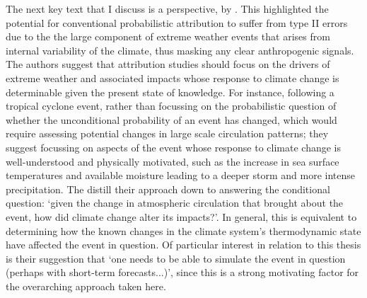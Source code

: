     The next key text that I discuss is a perspective,  by \citet{trenberth_attribution_2015}. This highlighted the potential for conventional probabilistic attribution to suffer from type II errors due to the the large component of extreme weather events that arises from internal variability of the climate, thus masking any clear anthropogenic signals. The authors suggest that attribution studies should focus on the drivers of extreme weather and associated impacts whose response to climate change is determinable given the present state of knowledge. For instance, following a tropical cyclone event, rather than focussing on the probabilistic question of whether the unconditional probability of an event has changed, which would require assessing potential changes in large scale circulation patterns; they suggest focussing on aspects of the event whose response to climate change is well-understood and physically motivated, such as the increase in sea surface temperatures and available moisture leading to a deeper storm and more intense precipitation. The distill their approach down to answering the conditional question: `given the change in atmospheric circulation that brought about the event, how did climate change alter its impacts?'. In general, this is equivalent to determining how the known changes in the climate system's thermodynamic state have affected the event in question. Of particular interest in relation to this thesis is their suggestion that `one needs to be able to simulate the event in question (perhaps with short-term forecasts...)', since this is a strong motivating factor for the overarching approach taken here.

